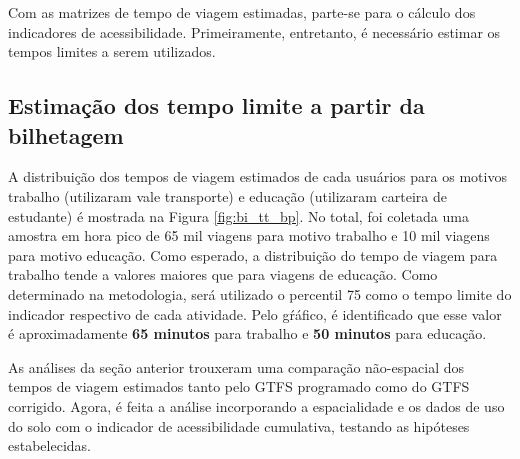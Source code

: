 \documentclass[        
    a4paper,          %
    12pt,             %
    chapter=TITLE,    %
    section=Title,    %
    subsection=Title, %
    oneside,          %
    english,          %
    spanish,          %
    brazil,           %
    fleqn             %
]{abntex2}
\begin{document}
  Com as matrizes de tempo de viagem estimadas, parte-se para o cálculo dos indicadores de acessibilidade. Primeiramente, entretanto, é necessário estimar os tempos limites a serem utilizados.
  
  \hypertarget{estimacao-dos-tempo-limite-a-partir-da-bilhetagem}{%
  \subsection{Estimação dos tempo limite a partir da bilhetagem}\label{estimacao-dos-tempo-limite-a-partir-da-bilhetagem}}
  
  A distribuição dos tempos de viagem estimados de cada usuários para os motivos trabalho (utilizaram vale transporte) e educação (utilizaram carteira de estudante) é mostrada na Figura \ref{fig:bi_tt_bp}. No total, foi coletada uma amostra em hora pico de 65 mil viagens para motivo trabalho e 10 mil viagens para motivo educação. Como esperado, a distribuição do tempo de viagem para trabalho tende a valores maiores que para viagens de educação. Como determinado na metodologia, será utilizado o percentil 75 como o tempo limite do indicador respectivo de cada atividade. Pelo gŕáfico, é identificado que esse valor é aproximadamente \textbf{65 minutos} para trabalho e \textbf{50 minutos} para educação.
  
  \begin{figure}[!h]
  \captionsetup{width=16cm}
  \centering
  \end{figure}
  
  As análises da seção anterior trouxeram uma comparação não-espacial dos tempos de viagem estimados tanto pelo GTFS programado como do GTFS corrigido. Agora, é feita a análise incorporando a espacialidade e os dados de uso do solo com o indicador de acessibilidade cumulativa, testando as hipóteses estabelecidas.
  
\end{document}
